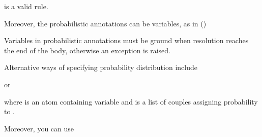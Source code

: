 \documentclass[letterpaper,10pt,english]{sphinxmanual}
\begin{document}
is a valid rule.

Moreover, the probabilistic annotations can be variables, as in ()

\begin{sphinxVerbatim}[commandchars=\\\{\}]

 
        
\end{sphinxVerbatim}

Variables in probabilistic annotations must be ground when resolution reaches the end of the body, otherwise an exception is raised.

Alternative ways of specifying probability distribution include

\begin{sphinxVerbatim}[commandchars=\\\{\}]
\end{sphinxVerbatim}

or

\begin{sphinxVerbatim}[commandchars=\\\{\}]
\end{sphinxVerbatim}

where  is an atom containing variable  and  is a list of couples  assigning probability  to .

Moreover, you can use

\begin{sphinxVerbatim}[commandchars=\\\{\}]
\end{sphinxVerbatim}
\end{document}
